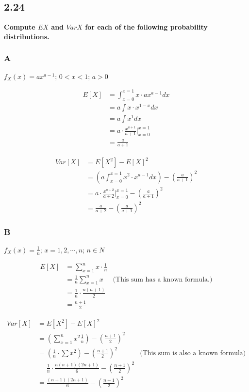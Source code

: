 \subsection*{2.24}

\textbf{Compute $EX$ and $VarX$ for each of the following probability distributions.}

\subsubsection*{A}

$f_X(x) = ax^{a-1}$; $0<x<1$; $a>0$

\begin{align*}
	E[X] &= \int_{x=0}^{x=1} x \cdot ax^{a-1} dx \\
	&= a \int x \cdot x^{1-x} dx \\
	&= a \int x^1 dx \\
	&= a \cdot \frac{x^{a+1}}{a+1} \bigg\rvert^{x=1}_{x=0} \\
	&= \frac{a}{a+1} 
\end{align*}

\begin{align*}
	Var[X] &= E[X^2] - E[X]^2 \\
	&= \left( a \int_{x=0}^{x=1} x^2 \cdot x^{a-1} dx \right) - \left(\frac{a}{a+1}\right)^2 \\
	&= a \cdot \frac{x^{a+2}}{a+2} \bigg\rvert_{x=0}^{x=1} - \left(\frac{a}{a+1}\right)^2 \\
	&= \frac{a}{a+2} - \left( \frac{a}{a+1} \right)^2
\end{align*}

\pagebreak


\subsubsection*{B}


$f_X(x) = \frac{1}{n}$; $x=1,2,\cdots,n$; $n \in N$

\begin{align*}
	E[X] &= \sum_{x=1}^n x \cdot \frac{1}{n} \\
	&= \frac{1}{n} \sum_{x=1}^n x & \text{(This sum has a known formula.)}\\
	&= \frac{1}{n} \cdot \frac{n(n+1)}{2} \\
	&= \frac{n+1}{2}
\end{align*}

\begin{align*}
	Var[X] &= E[X^2] - E[X]^2 \\
	&= \left( \sum_{x=1}^n x^2 \frac{1}{n} \right) - \left( \frac{n+1}{2} \right)^2 \\
	&= \left( \frac{1}{n} \cdot \sum x^2 \right) - \left( \frac{n+1}{2} \right)^2 & \text{(This sum is also a known formula)} \\
	&= \frac{1}{n} \cdot \frac{n(n+1)(2n+1)}{6} - \left( \frac{n+1}{2} \right)^2 \\
	&= \frac{(n+1)(2n+1)}{6} - \left( \frac{n+1}{2} \right)^2 
\end{align*}
